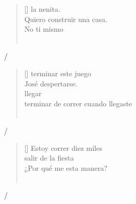 \documentclass[grid,avery5371]{flashcards}
\begin{document}
\begin{flashcard}{%
\begin{verse}[\versewidth]
 la nenita.\\
Quiero  construir una casa.\\
No  ti mismo \\
\hfill \\
\end{verse}
\hfill \break
{}


}
  /    
\end{flashcard}


\begin{flashcard}{%
\begin{verse}[\versewidth]
 terminar este juego\\
José  despertarse.\\
 llegar\\
 terminar de correr cuando llegaste\\
\hfill \\
\end{verse}
\hfill \break


}
  /    
\end{flashcard}


\begin{flashcard}{%
\begin{verse}[\versewidth]
Estoy  correr diez miles \\
 salir de la fiesta\\
¿Por qué me  esta manera?\\
\hfill \\
\end{verse}
\hfill \break

}

  /    \end{flashcard}
\end{document}

